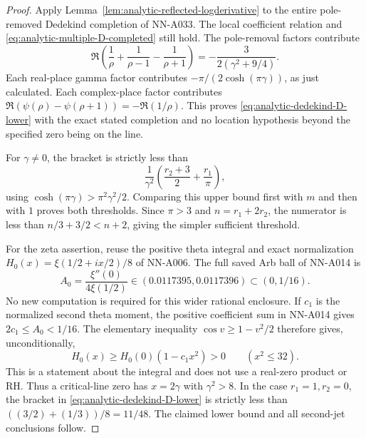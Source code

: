 \begin{proof}
Apply Lemma~\ref{lem:analytic-reflected-logderivative} to the
entire pole-removed Dedekind completion of NN-A033. The
local coefficient relation and
\eqref{eq:analytic-multiple-D-completed} still hold. The
pole-removal factors contribute
\[
 \Re\left(\frac1\rho+\frac1{\rho-1}
                                  -\frac1{\rho+1}\right)
                  =-\frac{3}{2(\gamma^2+9/4)}.
\]
Each real-place gamma factor contributes
$-\pi/(2\cosh(\pi\gamma))$, as just calculated. Each
complex-place factor contributes
$\Re(\psi(\rho)-\psi(\rho+1))=-\Re(1/\rho)$.
This proves \eqref{eq:analytic-dedekind-D-lower} with the
exact stated completion and no location hypothesis beyond
the specified zero being on the line.

For $\gamma\ne0$, the bracket is strictly less than
\[
 \frac1{\gamma^2}
        \left(\frac{r_2+3}{2}+\frac{r_1}{\pi}\right),
\]
using $\cosh(\pi\gamma)>\pi^2\gamma^2/2$. Comparing this
upper bound first with $m$ and then with $1$ proves both
thresholds. Since $\pi>3$ and $n=r_1+2r_2$,
the numerator is less than $n/3+3/2<n+2$, giving the
simpler sufficient threshold.

For the zeta assertion, reuse the positive theta integral
and exact normalization $H_0(x)=\xi(1/2+ix/2)/8$ of
NN-A006. The full saved Arb ball of NN-A014 is
\[
 A_0=\frac{\xi''(0)}{4\xi(1/2)}
       \in (0.0117395,0.0117396)\subset(0,1/16).
\]
No new computation is required for this wider rational
enclosure. If $c_1$ is the normalized second theta moment,
the positive coefficient sum in NN-A014 gives
$2c_1\le A_0<1/16$. The elementary inequality
$\cos v\ge1-v^2/2$ therefore gives, unconditionally,
\[
 H_0(x)\ge H_0(0)(1-c_1x^2)>0\qquad(x^2\le32).
\]
This is a statement about the integral and does not use a
real-zero product or RH. Thus a critical-line zero has
$x=2\gamma$ with $\gamma^2>8$. In the case $r_1=1,r_2=0$,
the bracket in \eqref{eq:analytic-dedekind-D-lower} is
strictly less than
$((3/2)+(1/3))/8=11/48$. The claimed lower bound and all
second-jet conclusions follow.
\end{proof}

